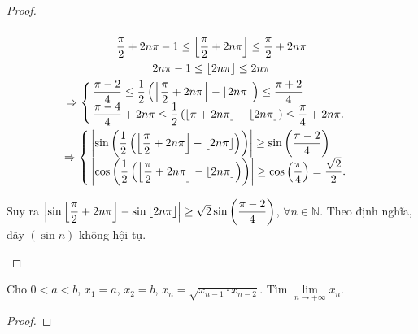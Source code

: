 \documentclass[class=analysis,crop=false]{standalone}
\begin{document}
\begin{proof}
\begin{enumerate}[label = (\roman*)]
\[            \]
            \begin{gather*}
                \dfrac{\pi}{2} + 2n\pi - 1\le \left\lfloor{\dfrac{\pi}{2} + 2n\pi}\right\rfloor \le \dfrac{\pi}{2} + 2n\pi \\
                2n\pi - 1\le \left\lfloor{2n\pi}\right\rfloor \le 2n\pi \\
                \Rightarrow
                \begin{cases}
                    \dfrac{\pi - 2}{4}\le\dfrac{1}{2}\left(\left\lfloor{\dfrac{\pi}{2} + 2n\pi}\right\rfloor - \left\lfloor{2n\pi}\right\rfloor\right) \le \dfrac{\pi + 2}{4} \\
                    \dfrac{\pi - 4}{4} + 2n\pi\le \dfrac{1}{2}\left(\left\lfloor{\pi + 2n\pi}\right\rfloor + \left\lfloor{2n\pi}\right\rfloor\right) \le \dfrac{\pi}{4} + 2n\pi.
                \end{cases} \\
                \Rightarrow
                \begin{cases}
                    \left\vert{\sin\left(\dfrac{1}{2}\left(\left\lfloor{\dfrac{\pi}{2} + 2n\pi}\right\rfloor - \left\lfloor{2n\pi}\right\rfloor\right)\right)}\right\vert \ge \sin\left(\dfrac{\pi - 2}{4}\right) \\
                    \left\vert{\cos\left(\dfrac{1}{2}\left(\left\lfloor{\dfrac{\pi}{2} + 2n\pi}\right\rfloor - \left\lfloor{2n\pi}\right\rfloor\right)\right)}\right\vert\ge\cos\left(\dfrac{\pi}{4}\right) = \dfrac{\sqrt{2}}{2}.
                \end{cases}
            \end{gather*}
            \par Suy ra $\left\vert{\sin\left\lfloor{\dfrac{\pi}{2} + 2n\pi}\right\rfloor - \sin\left\lfloor{2n\pi}\right\rfloor}\right\vert\ge \sqrt{2}\sin\left(\dfrac{\pi-2}{4}\right)$, $\forall n\in\mathbb{N}$. Theo định nghĩa, dãy $(\sin n)$ không hội tụ.
    \end{enumerate}
\end{proof}

\begin{exercise}
    Cho $0 < a < b$, $x_{1} = a$, $x_{2} = b$, $x_{n} = \sqrt{x_{n-1}\cdot x_{n-2}}$. Tìm $\lim\limits_{n\to+\infty} x_{n}$.
\end{exercise}

\begin{proof}
\end{proof}
\end{document}
